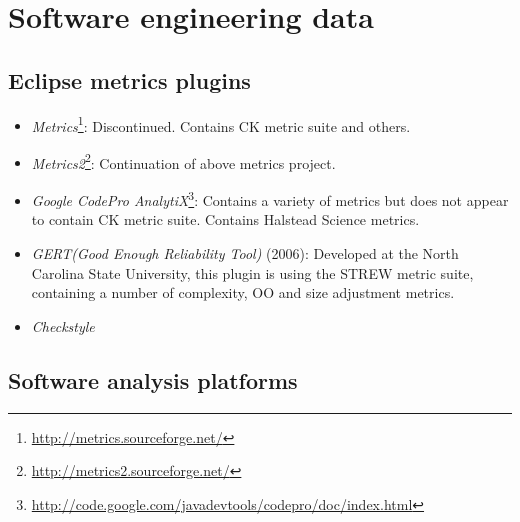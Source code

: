 \section{Software engineering data}
\label{appdx:tools}

\subsection{Eclipse metrics plugins}

\begin{itemize}

	\item \textit{Metrics}\footnote{\url{http://metrics.sourceforge.net/}}: Discontinued. Contains CK metric suite and others.

	\item\textit{Metrics2}\footnote{\url{http://metrics2.sourceforge.net/}}:  Continuation of above metrics project.

	\item \textit{Google CodePro AnalytiX}\footnote{\url{http://code.google.com/javadevtools/codepro/doc/index.html}}: Contains a variety of metrics but does not appear to contain CK metric suite. Contains Halstead Science metrics.

	\item \textit{GERT(Good Enough Reliability Tool)} (2006): Developed at the North Carolina State University, this plugin is using the STREW metric suite, containing a number of complexity, OO and size adjustment metrics.

	\item \textit{Checkstyle}

\end{itemize}

\subsection{Software analysis platforms} 


